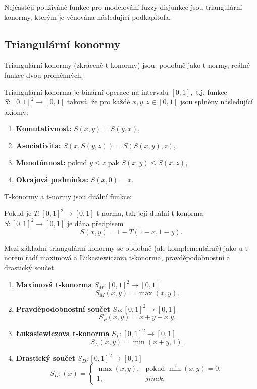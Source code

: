 Nej\v cast\v eji pou\v z\'iv\'aně funkce pro modelov\'an\'i fuzzy disjunkce jsou triangul\'arn\'i konormy, kter\'ym je v\v enov\'ana n\'asleduj\'ic\'i podkapitola.

\subsection{Triangul\'arn\'i konormy} 
\label{sec: Triangulární konormy}

Triangulární konormy (zkráceně t-konormy) jsou, podobn\v e jako  t-normy, re\'aln\'e funkce dvou prom\v enn\'ych:
\begin{definition}
    Triangulární konorma je binární operace na intervalu $[0,1],$ t.j. funkce $S: [0,1]^2 \rightarrow [0,1]$ taková, že pro každé $x, y, z \in [0,1]$ jsou splněny následující axiomy:
    \begin{enumerate}
        \item \textbf{Komutativnost: } $S(x,y) = S(y,x),$
        \item \textbf{Asociativita: } $S(x,S(y,z)) = S(S(x,y),z)$,
        \item \textbf{Monotónnost:} pokud $y \leq z$ pak $S(x, y) \leq S(x, z)$,
        \item \textbf{Okrajová podmínka: } $S(x,0) = x.$
    \end{enumerate}
\end{definition}

T-konormy a t-normy jsou du\'aln\'i funkce:

\begin{sentence}
    \cite{Springer}
    Pokud je $T:[0,1]^2\to [0,1]$ t-norma, tak její duální t-konorma $S: [0,1]^2 \rightarrow [0,1]$ je dána předpisem $$S(x,y) = 1 - T(1-x, 1-y).$$
\end{sentence}


Mezi základní triangulární konormy se obdobně (ale komplementárně) jako u t-norem řadí maximová a Łukasiewiczova t-konorma, pravděpodobnostní a drastický součet.
\begin{example}
\cite{Springer}
    \begin{enumerate}
    \item \textbf{Maximová t-konorma} $S_M: [0,1]^2 \rightarrow [0,1]$
    $$S_M(x,y) = \max(x,y).$$
    \item \textbf{Pravděpodobnostní součet} $S_P: [0,1]^2 \rightarrow [0,1]$
    $$S_P(x,y) = x+y-x.y.$$
    \item \textbf{Łukasiewiczova t-konorma} $S_L: [0,1]^2 \rightarrow [0,1]$
    $$S_L(x,y) = \min(x+y,1).$$
    \item \textbf{Drastický součet} $S_D: [0,1]^2 \rightarrow [0,1]$
    $$S_D:(x)=\begin{cases} \max(x,y), & \mbox{pokud  }  \min(x,y) = 0,\\ 
    1, &  jinak.  \end{cases}$$
\end{enumerate}
\end{example}



